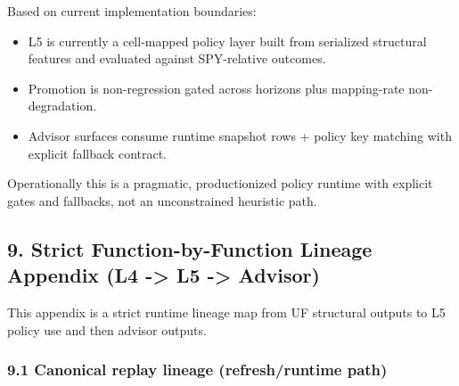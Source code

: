 \documentclass[
]{article}
\providecommand{\tightlist}{%
  \setlength{\itemsep}{0pt}\setlength{\parskip}{0pt}}
\begin{document}
Based on current implementation boundaries:

\begin{itemize}
\tightlist
\item
  L5 is currently a cell-mapped policy layer built from serialized
  structural features and evaluated against SPY-relative outcomes.
\item
  Promotion is non-regression gated across horizons plus mapping-rate
  non-degradation.
\item
  Advisor surfaces consume runtime snapshot rows + policy key matching
  with explicit fallback contract.
\end{itemize}

Operationally this is a pragmatic, productionized policy runtime with
explicit gates and fallbacks, not an unconstrained heuristic path.

\subsection{9. Strict Function-by-Function Lineage Appendix (L4
-\textgreater{} L5 -\textgreater{}
Advisor)}\label{9-strict-function-by-function-lineage-appendix-l4---l5---advisor}

This appendix is a strict runtime lineage map from UF structural outputs
to L5 policy use and then advisor outputs.

\subsubsection{9.1 Canonical replay lineage (refresh/runtime
path)}\label{91-canonical-replay-lineage-refreshruntime-path}
\end{document}
